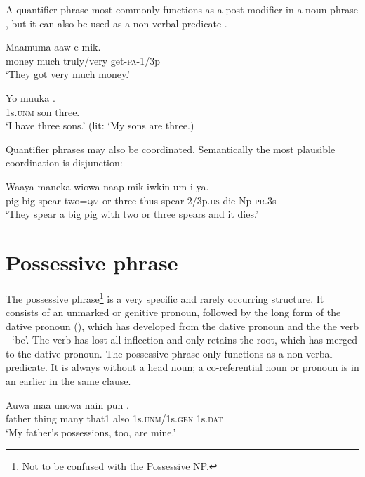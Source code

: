 A quantifier phrase most commonly functions as a post-modifier in a noun phrase , but it can also be used as a non-verbal predicate .

\ea%
\label{ex:4:x846}
\gll Maamuma     aaw-e-mik. \\
   money  much  truly/very  get-\textsc{pa}-1/3p   \\
\glt`They got very much money.'
\z

\ea%
\label{ex:4:x843}
\gll Yo  muuka  . \\
  1s.\textsc{unm}  son  three.    \\
\glt`I have three sons.'  (lit: `My sons are three.)
\z

Quantifier phrases may also be coordinated. Semantically the most plausible coordination is disjunction: 

\ea%
\label{ex:4:x1360}
\gll Waaya  maneka  wiowa      naap  mik-iwkin um-i-ya.\\
    pig  big  spear  two=\textsc{qm}  or  three  thus  spear-2/3p.\textsc{ds} die-Np-\textsc{pr}.3s   \\
\glt`They spear a big pig with two or three spears and it dies.'
\z

\section{Possessive phrase} \label{sec:4.4}
{}
The possessive phrase\footnote{Not to be confused with the Possessive NP.} is a very specific and rarely occurring structure. It consists of an unmarked or genitive pronoun, followed by the long form of the dative pronoun (), which has developed from the dative pronoun and the the verb - `be'. The verb has lost all inflection and only retains the root, which has merged to the dative pronoun. The possessive phrase only functions as a non-verbal predicate. It is always without a head noun; a co-referential noun or pronoun is in an earlier  in the same clause.

\ea%
\label{ex:4:x847}
\gll Auwa  maa  unowa  nain  pun   . \\
   father  thing  many  that1  also  1s.\textsc{unm}/1s.\textsc{gen}  1s.\textsc{dat}   \\
\glt`My father's possessions, too, are mine.'
\z

